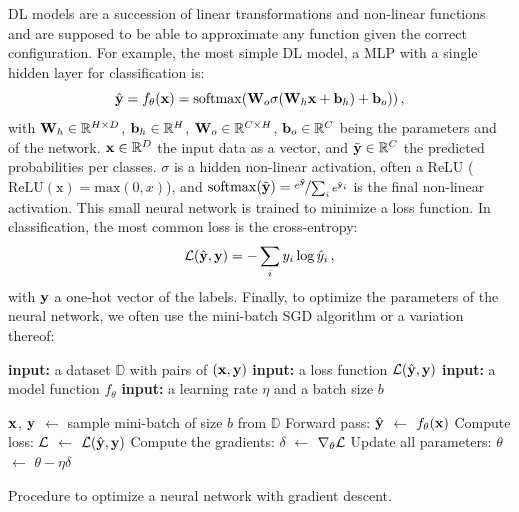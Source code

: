 \ac{DL} models are a succession of linear transformations and non-linear functions and are supposed
to be able to approximate any function \citep{gelenbe1999universalapprox} given the correct
configuration. For example, the most simple \ac{DL} model, a \ac{MLP} with a single hidden layer for
classification is:
%
\begin{equation}
      \hat{\mathbf{y}} = f_\theta(\mathbf{x}) = \operatorname{softmax}(\mathbf{W}_o \sigma(\mathbf{W}_h \mathbf{x} + \mathbf{b}_h) + \mathbf{b}_o))\,,
      \label{eq:intro_mlp}
\end{equation}
%
\noindent with $\mathbf{W}_h \in \mathbb{R}^{H \times D}$, $\mathbf{b}_h \in \mathbb{R}^{H}$, $\mathbf{W}_o \in
      \mathbb{R}^{C \times H}$, $\mathbf{b}_o \in \mathbb{R}^{C}$ being the parameters and of the network. $\mathbf{x}
      \in \mathbb{R}^D$ the input data as a vector, and $\tilde{\mathbf{y}} \in \mathbb{R}^C$ the predicted
probabilities per classes. $\sigma$ is a hidden non-linear activation, often a \ac{ReLU}
($\operatorname{ReLU(x)} = \text{max}(0, x)$), and $\operatorname{softmax}(\tilde{\mathbf{y}}) =
      \nicefrac{e^{\tilde{\mathbf{y}}}}{\sum_{i} e^{\tilde{\mathbf{y}}_i}}$ is the final non-linear activation. This
small neural network is trained to minimize a loss function. In classification, the most common loss is
the cross-entropy:
%
\begin{equation}
      \mathcal{L}(\hat{\mathbf{y}}, \mathbf{y}) = -\sum_i y_i \log \hat{y}_i\,,
      \label{eq:intro_ce}
\end{equation}
%
\noindent with $\mathbf{y}$ a one-hot vector of the labels. Finally, to optimize the parameters of the neural
network, we often use the mini-batch \ac{SGD} algorithm or a variation thereof:

\begin{algorithm}
      \begin{algorithmic}[1]
            \Statex \textbf{input:} a dataset $\mathbb{D}$ with pairs of $(\mathbf{x}, \mathbf{y})$
            \Statex \textbf{input:} a loss function $\mathcal{L}(\hat{\mathbf{y}}, \mathbf{y})$
            \Statex \textbf{input:} a model function $f_\theta$
            \Statex \textbf{input:} a learning rate $\eta$ and a batch size $b$
            \Statex

            \State $\mathbf{x}$, $\mathbf{y}$ $\gets$ sample mini-batch of size $b$ from $\mathbb{D}$
            \State Forward pass: $\hat{\mathbf{y}}$ $\gets$ $f_\theta(\mathbf{x})$
            \State Compute loss: $\mathcal{L}$ $\gets$ $\mathcal{L}(\hat{\mathbf{y}}, \mathbf{y})$
            \State Compute the gradients: $\delta$ $\gets$ $\nabla_\theta \mathcal{L}$
            \State Update all parameters: $\theta$ $\gets$ $\theta - \eta \delta$
            \EndWhile
      \end{algorithmic}
      \caption{Procedure to optimize a neural network with gradient descent.}
      \label{algo:intro_sgd}
\end{algorithm}


